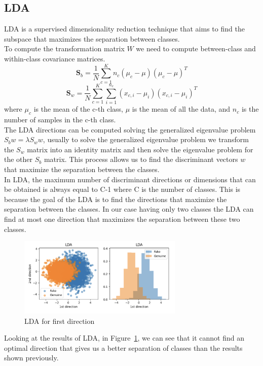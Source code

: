 \documentclass{article}
\begin{document}
\subsection{LDA}
LDA is a supervised dimensionality reduction technique that aims to find the subspace that maximizes the separation between classes. \\
To compute the transformation matrix \( W \) we need to compute between-class and within-class covariance matrices.
\begin{equation}
\mathbf{S}_b =\frac{1}{N}\sum_{c=1}^{K} n_c (\mu_c - \mu)(\mu_c - \mu)^T
\end{equation}
\begin{equation}
    \mathbf{S}_w = \frac{1}{N}\sum_{c=1}^{K} \sum_{i=1}^{n_c} (x_{c,i} - \mu_i)(x_{c,i} - \mu_i)^T
    \end{equation}
where \( \mu_c \) is the mean of the c-th class, \( \mu \) is the mean of all the data, and \( n_c \) is the number of samples in the c-th class.\\
The LDA directions can be computed solving the generalized eigenvalue problem \(S_b w=\lambda S_w w\), usually to solve the generalized eigenvalue problem we transform the \(S_w\) matrix into an identity matrix and then solve the eigenvalue problem for the other \(S_b \) matrix. This process allows us to find the discriminant vectors \(w\) that maximize the separation between the classes.\\
In LDA, the maximum number of discriminant directions or dimensions that can be obtained is always equal to C-1 where C is the number of classes. This is because the goal of the LDA is to find the directions that maximize the separation between the classes. 
In our case having only two classes the LDA can find at most one direction that maximizes the separation between these two classes.
\begin{figure}[H]
    \centering
    \includegraphics[width=0.7\textwidth]{./img/LDA.png}
    \caption{LDA for first direction}
    \label{fig:LDA}
\end{figure} 
Looking at the results of LDA, in Figure~\ref{fig:LDA}, we can see that it cannot find an optimal direction that gives us a better separation of classes than the results shown previously.
\end{document}
